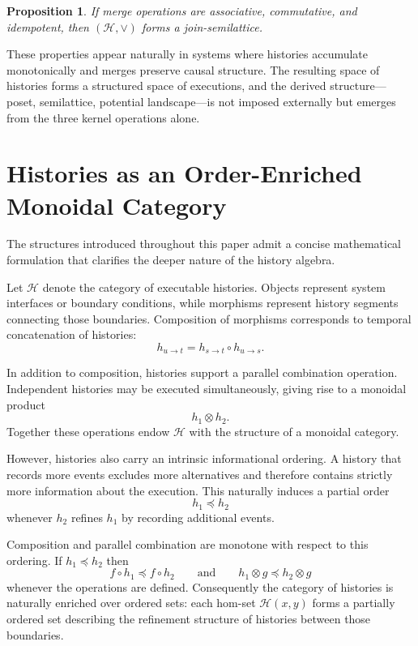 \documentclass[12pt]{article}
\newtheorem{proposition}{Proposition}
\begin{document}
\begin{proposition}
If merge operations are associative, commutative, and idempotent, then $(\mathcal{H}, \vee)$
forms a join-semilattice.
\end{proposition}

These properties appear naturally in systems where histories accumulate monotonically and merges
preserve causal structure. The resulting space of histories forms a structured space of
executions, and the derived structure---poset, semilattice, potential landscape---is not imposed
externally but emerges from the three kernel operations alone.

\section{Histories as an Order-Enriched Monoidal Category}
\label{sec:categorical}

The structures introduced throughout this paper admit a concise mathematical formulation that
clarifies the deeper nature of the history algebra.

Let $\mathcal{H}$ denote the category of executable histories. Objects represent system
interfaces or boundary conditions, while morphisms represent history segments connecting those
boundaries. Composition of morphisms corresponds to temporal concatenation of histories:
\[
h_{u \to t} = h_{s \to t} \circ h_{u \to s}.
\]

In addition to composition, histories support a parallel combination operation. Independent
histories may be executed simultaneously, giving rise to a monoidal product
\[
h_1 \otimes h_2.
\]
Together these operations endow $\mathcal{H}$ with the structure of a monoidal category.

However, histories also carry an intrinsic informational ordering. A history that records more
events excludes more alternatives and therefore contains strictly more information about the
execution. This naturally induces a partial order
\[
h_1 \preceq h_2
\]
whenever $h_2$ refines $h_1$ by recording additional events.

Composition and parallel combination are monotone with respect to this ordering. If
$h_1 \preceq h_2$ then
\[
f \circ h_1 \preceq f \circ h_2
\qquad \text{and} \qquad
h_1 \otimes g \preceq h_2 \otimes g
\]
whenever the operations are defined. Consequently the category of histories is naturally
enriched over ordered sets: each hom-set $\mathcal{H}(x,y)$ forms a partially ordered set
describing the refinement structure of histories between those boundaries.
\end{document}
